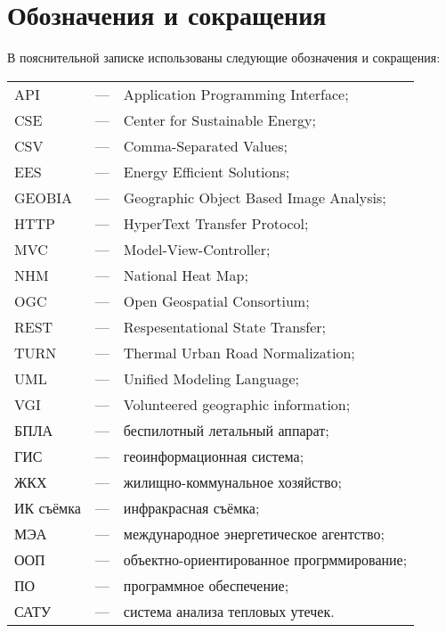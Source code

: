 {
	\titleformat{\section}[block]{\centering\normalfont\large\bfseries}{\thesection}{10pt}{}
	\section*{\centering Обозначения и сокращения}
}

В пояснительной записке использованы следующие обозначения и сокращения: 

\begin{tabular}{lcl}

	API & --- & Application Programming Interface; \\
	CSE & --- & Center for Sustainable Energy; \\
	CSV & --- & Comma-Separated Values; \\
	EES & --- & Energy Efficient Solutions; \\
	GEOBIA & --- & Geographic Object Based Image Analysis; \\
	HTTP & --- & HyperText Transfer Protocol; \\
	MVC & --- & Model-View-Controller; \\
	NHM & --- & National Heat Map; \\
	OGC & --- & Open Geospatial Consortium; \\
	REST & --- & Respesentational State Transfer; \\
	TURN & --- & Thermal Urban Road Normalization; \\
	UML & --- & Unified Modeling Language; \\
	VGI & --- & Volunteered geographic information; \\
	БПЛА & --- & беспилотный летальный аппарат; \\
	ГИС & --- & геоинформационная система; \\
	ЖКХ & --- & жилищно-коммунальное хозяйство; \\
	ИК съёмка & --- & инфракрасная съёмка; \\
	МЭА & --- & международное энергетическое агентство; \\
	ООП & --- & объектно-ориентированное прогрммирование; \\
	ПО & --- & программное обеспечение; \\
	САТУ & --- & система анализа тепловых утечек. \\

\end{tabular}

\pagebreak